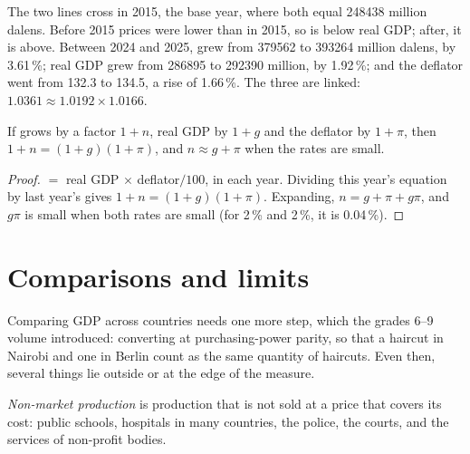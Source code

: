 The two lines cross in 2015, the base year, where both equal \num{248438} million dalens. Before 2015 prices were lower than in 2015, so  is below real
GDP; after, it is above. Between 2024 and 2025,  grew from \num{379562} to \num{393264} million dalens, by 3.61\,\%; real GDP grew from \num{286895} to
\num{292390} million, by 1.92\,\%; and the deflator went from 132.3 to 134.5, a rise of 1.66\,\%. The three are linked: $1.0361 \approx 1.0192 \times 1.0166$.

\begin{proposition}\label{prop:g10:national-accounts:split}
If  grows by a factor $1 + n$, real GDP by $1 + g$ and the deflator by $1 + \pi$, then $1 + n = (1 + g)(1 + \pi)$, and $n \approx g + \pi$ when the rates
are small.
\end{proposition}
\begin{proof}
 $=$ real GDP $\times$ deflator$/100$, in each year. Dividing this year's equation by last year's gives $1 + n = (1 + g)(1 + \pi)$. Expanding, $n = g + \pi
+ g\pi$, and $g\pi$ is small when both rates are small (for 2\,\% and 2\,\%, it is 0.04\,\%).
\end{proof}

\section{Comparisons and limits}\label{sec:g10:national-accounts:limits}

Comparing GDP across countries needs one more step, which the grades 6--9 volume introduced: converting at purchasing-power parity, so that a haircut in Nairobi
and one in Berlin count as the same quantity of haircuts. Even then, several things lie outside or at the edge of the measure.

\begin{definition}\label{def:g10:national-accounts:non-market}
\emph{Non-market production} is production that is not sold at a price that covers its cost: public schools, hospitals in many
countries, the police, the courts, and the services of non-profit bodies.
\end{definition}

